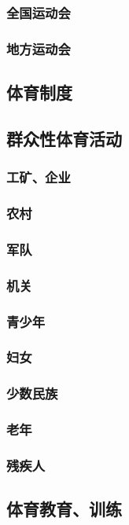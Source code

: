 \documentclass[UTF8]{../../ApplicationUniverse}
\begin{document}
        \subsubsection{全国运动会}
        \subsubsection{地方运动会}
     
    \subsection{体育制度}
    \subsection{群众性体育活动}
        \subsubsection{工矿、企业}
        \subsubsection{农村}
        \subsubsection{军队}
        \subsubsection{机关}
        \subsubsection{青少年}
        \subsubsection{妇女}
        \subsubsection{少数民族}
        \subsubsection{老年}
        \subsubsection{残疾人}
    \subsection{体育教育、训练}
\end{document}
